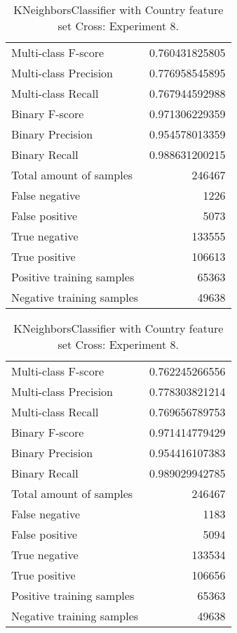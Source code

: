 \begin{table}[H]
\begin{minipage}{0.5\textwidth}
\caption{KNeighborsClassifier with Country feature set Cross: Experiment 7.}
\centering
\begin{tabular}{l r}
\toprule
Multi-class F-score & 0.760431825805 \\
Multi-class Precision & 0.776958545895 \\
Multi-class Recall & 0.767944592988 \\
\midrule
Binary F-score & 0.971306229359 \\
Binary Precision & 0.954578013359 \\
Binary Recall & 0.988631200215 \\
\midrule
Total amount of samples & 246467 \\
False negative & 1226 \\
False positive & 5073 \\
True negative & 133555 \\
True positive & 106613 \\
\midrule
Positive training samples & 65363 \\
Negative training samples & 49638 \\
\bottomrule
\end{tabular}
\end{minipage}
\hfillx
\begin{minipage}{0.5\textwidth}
\caption{KNeighborsClassifier with Country feature set Cross: Experiment 8.}
\centering
\begin{tabular}{l r}
\toprule
Multi-class F-score & 0.762245266556 \\
Multi-class Precision & 0.778303821214 \\
Multi-class Recall & 0.769656789753 \\
\midrule
Binary F-score & 0.971414779429 \\
Binary Precision & 0.954416107383 \\
Binary Recall & 0.989029942785 \\
\midrule
Total amount of samples & 246467 \\
False negative & 1183 \\
False positive & 5094 \\
True negative & 133534 \\
True positive & 106656 \\
\midrule
Positive training samples & 65363 \\
Negative training samples & 49638 \\
\bottomrule
\end{tabular}
\end{minipage}
\end{table}
